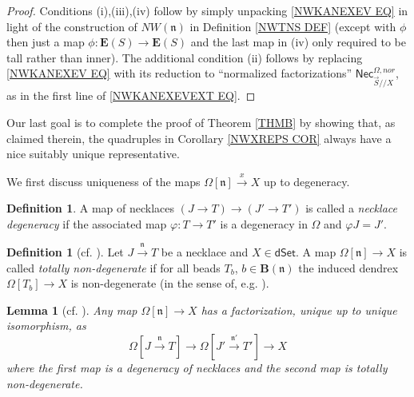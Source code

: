 \documentclass[a4paper,10pt]{article}%
\numberwithin{equation}{section}
\numberwithin{figure}{section}
\newtheorem{lemma}[equation]{Lemma}%
\theoremstyle{definition} %
\newtheorem{definition}[equation]{Definition}%
\begin{document}
\begin{proof}
	Conditions (i),(iii),(iv) follow by simply unpacking \eqref{NWKANEXEV EQ} in light of the construction of 
	$NW(\mathfrak{n})$ in Definition \ref{NWTNS DEF}
	(except with $\phi$ then just a map
	$\phi\colon \boldsymbol{E}(S) \to \boldsymbol{E}(S)$
	and the last map in (iv) only required to be tall rather than inner).
	The additional condition (ii) follows by replacing 
	\eqref{NWKANEXEV EQ} with its reduction to 
	``normalized
	factorizations''
	$\mathsf{Nec}_{\vec{S}//X}^{\Omega,nor}$,
	as in the first line of \eqref{NWKANEXEVEXT EQ}.
\end{proof}



Our last goal is to complete the proof of Theorem \ref{THMB}
by showing that, as claimed therein, 
the quadruples in Corollary \ref{NWXREPS COR}
always have a nice suitably unique representative.


We first discuss uniqueness of the maps
$\Omega[\mathfrak{n}] \xrightarrow{x} X$ up to degeneracy.

\begin{definition}\label{NECKDEG DEF}
	A map of necklaces 
	$(J\to T) \to (J' \to T')$
	is called a \emph{necklace degeneracy}
	if the associated map
	$\varphi \colon T \to T'$
	is a degeneracy in $\Omega$
	and $\varphi J = J'$.
\end{definition}



\begin{definition}[{cf. \cite[\S 4]{DS11}}]
        \label{TOTNONDEG_DEF}
	Let $J \xrightarrow{\mathfrak{n}} T$ be a necklace and 
	$X \in \mathsf{dSet}$.
	A map $\Omega[\mathfrak{n}] \to X$
	is called \emph{totally non-degenerate}
	if for all beads $T_b$, 
	$b \in \boldsymbol{B}(\mathfrak{n})$
	the induced dendrex
	$\Omega[T_b] \to X$
	is non-degenerate (in the sense of, 
	e.g. \cite[Prop. 5.62]{Per18}).
\end{definition}



\begin{lemma}[{cf. \cite[Prop. 4.7]{DS11}}]
	\label{DEGNECK LEM}
	Any map 
	$\Omega[\mathfrak{n}] \to X$
	has a factorization, unique up to unique isomorphism, as
\[
	\Omega[J \xrightarrow{\mathfrak{n}} T] \to 
	\Omega[J' \xrightarrow{\mathfrak{n'}} T'] \to X
\]
	where the first map is a degeneracy of necklaces
	and the second map is totally non-degenerate.
\end{lemma}
\end{document}
